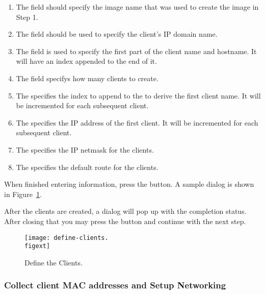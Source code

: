 \begin{enumerate}

\item The  field should specify the image name that was used to 
create the image in Step 1.

\item The  field should be used to specify the client's IP
domain name.

\item The  field is used to specify the first part of the 
client name and hostname. It will have an index appended to the end of it.

\item The  field specifys how many clients to create.

\item The  specifies the index to append
to the  to derive the first client name. It will be incremented
for each subsequent client.

\item The  specifies the IP address of the first client. It 
will be incremented for each subsequent client.

\item The  specifies the IP netmask for the clients.

\item The  specifies the default route for the clients.

\end{enumerate}
  
When finished entering information, press the  button.
A sample dialog is shown in Figure~\ref{fig:detailed-define-clients}. 

After the clients are created,
a dialog will pop up with the completion status. After closing that 
you may press the  button and continue with the next step.

\begin{figure}[htbp]
  \begin{center}
    \texttt{[image: define-clients.\\figext]}
    \caption{Define the Clients.}
    \label{fig:detailed-define-clients}
  \end{center}
\end{figure}
    
\subsubsection{Collect client MAC addresses and Setup Networking} 

